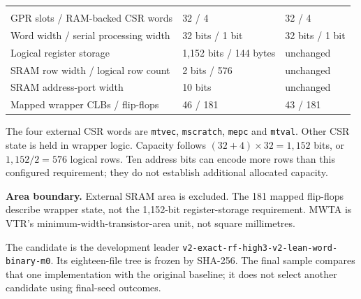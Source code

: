 {\small{}
\begin{tabularx}{\textwidth}{@{}Y P{37mm}P{37mm}@{}}
 &  &  \\
GPR slots / RAM-backed CSR words & 32 / 4 & 32 / 4 \\
Word width / serial processing width & 32 bits / 1 bit & 32 bits / 1 bit \\
Logical register storage & 1,152 bits / 144 bytes & unchanged \\
SRAM row width / logical row count & 2 bits / 576 & unchanged \\
SRAM address-port width & 10 bits & unchanged \\
Mapped wrapper CLBs / flip-flops & 46 / 181 & 43 / 181 \\
\end{tabularx}
}
\par
The four external CSR words are \texttt{mtvec}, \texttt{mscratch}, \texttt{mepc} and \texttt{mtval}. Other CSR state is held in wrapper logic. Capacity follows $(32+4)\times32=1{,}152$ bits, or $1{,}152/2=576$ logical rows. Ten address bits can encode more rows than this configured requirement; they do not establish additional allocated capacity.

\begin{scopebox}\textbf{Area boundary.} External SRAM area is excluded. The 181 mapped flip-flops describe wrapper state, not the 1,152-bit register-storage requirement. MWTA is VTR's minimum-width-transistor-area unit, not square millimetres.\end{scopebox}

The candidate is the development leader \nolinkurl{v2-exact-rf-high3-v2-lean-word-binary-m0}. Its eighteen-file tree is frozen by SHA-256. The final sample compares that one implementation with the original baseline; it does not select another candidate using final-seed outcomes.

